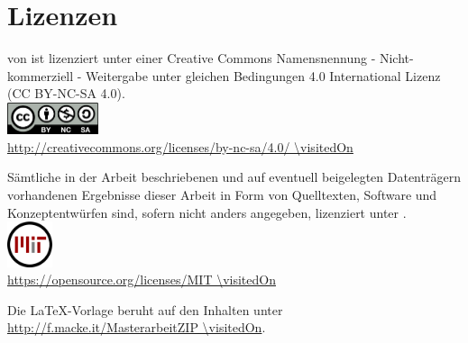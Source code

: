 \chapter*{Lizenzen}

\begin{center}

\vspace*{\fill}

\quotes{\thema} von \autor\space ist lizenziert unter einer Creative Commons Namensnennung - Nicht-kommerziell - Weitergabe unter gleichen Bedingungen 4.0 International Lizenz (CC BY-NC-SA 4.0). \\
\includegraphics[width=0.2\textwidth]{Bilder/by-nc-sa-eu}\\
\url{http://creativecommons.org/licenses/by-nc-sa/4.0/ \visitedOn}

\vspace*{\fill}

Sämtliche in der Arbeit beschriebenen und auf eventuell beigelegten Datenträgern
vorhandenen Ergebnisse dieser Arbeit in Form von Quelltexten, Software und
Konzeptentwürfen sind, sofern nicht anders angegeben, lizenziert unter . \\
\includegraphics[width=0.1\textwidth]{Bilder/mit_license}\\
\url{https://opensource.org/licenses/MIT \visitedOn}

\vspace*{\fill}

Die LaTeX-Vorlage beruht auf den Inhalten unter\\
\url{http://f.macke.it/MasterarbeitZIP \visitedOn}.

\vspace*{\fill}

\end{center}
